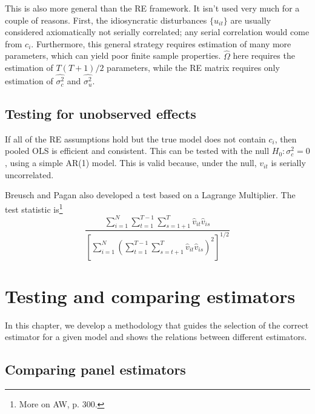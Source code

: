 \documentclass[11pt, a4paper]{report}
\theoremstyle{plain}
\theoremstyle{plain}
\theoremstyle{remark}
\begin{document}
This is also more general than the RE framework. It isn't used very much for a couple of reasons. First, the idiosyncratic disturbances $\{u_{it}\}$  are usually considered axiomatically not serially correlated; any serial correlation would come from $c_i$. Furthermore, this general strategy requires estimation of many more parameters, which can yield poor finite sample properties. $\hat{\Omega}$ here requires the estimation of $T(T+1)/2$ parameters, while the RE matrix requires only estimation of $\hat{\sigma^2_c}$ and $\hat{\sigma^2_u}$.

\section{Testing for unobserved effects}

If all of the RE assumptions hold but the true model does not contain $c_i$, then pooled OLS is efficient and consistent. This can be tested with the null $H_0: \sigma_c^2 = 0$, using a simple AR(1) model. This is valid because, under the null, $v_{it}$ is serially uncorrelated. 

Breusch and Pagan also developed a test based on a Lagrange Multiplier. The test statistic is\footnote{More on AW, p. 300.} 
\begin{equation}
    \frac{\sum_{i=1}^{N} \sum_{t=1}^{T-1} \sum_{s=1+1}^{T} \hat{v}_{i t} \hat{v}_{i s}}{\left[\sum_{i=1}^{N}\left(\sum_{t=1}^{T-1} \sum_{s=t+1}^{T} \hat{v}_{i t} \hat{v}_{i s}\right)^{2}\right]^{1 / 2}}
    \end{equation}















\chapter{Testing and comparing estimators}

In this chapter, we develop a methodology that guides the selection of the correct estimator for a given model and shows the relations between different estimators.


\section{Comparing panel estimators}
\end{document}
